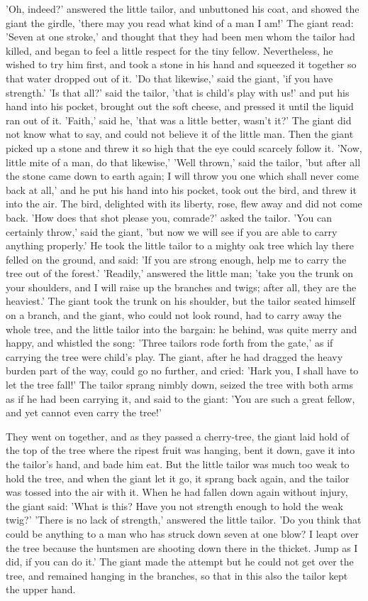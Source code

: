 \documentclass[12pt]{book}
\begin{document}
'Oh, indeed?' answered the little tailor, and unbuttoned his coat, and
showed the giant the girdle, 'there may you read what kind of a man I
am!' The giant read: 'Seven at one stroke,' and thought that they had
been men whom the tailor had killed, and began to feel a little
respect for the tiny fellow. Nevertheless, he wished to try him first,
and took a stone in his hand and squeezed it together so that water
dropped out of it. 'Do that likewise,' said the giant, 'if you have
strength.' 'Is that all?' said the tailor, 'that is child's play with
us!' and put his hand into his pocket, brought out the soft cheese,
and pressed it until the liquid ran out of it. 'Faith,' said he, 'that
was a little better, wasn't it?' The giant did not know what to say,
and could not believe it of the little man. Then the giant picked up a
stone and threw it so high that the eye could scarcely follow it.
'Now, little mite of a man, do that likewise,' 'Well thrown,' said the
tailor, 'but after all the stone came down to earth again; I will
throw you one which shall never come back at all,' and he put his hand
into his pocket, took out the bird, and threw it into the air. The
bird, delighted with its liberty, rose, flew away and did not come
back. 'How does that shot please you, comrade?' asked the tailor. 'You
can certainly throw,' said the giant, 'but now we will see if you are
able to carry anything properly.' He took the little tailor to a
mighty oak tree which lay there felled on the ground, and said: 'If
you are strong enough, help me to carry the tree out of the forest.'
'Readily,' answered the little man; 'take you the trunk on your
shoulders, and I will raise up the branches and twigs; after all, they
are the heaviest.' The giant took the trunk on his shoulder, but the
tailor seated himself on a branch, and the giant, who could not look
round, had to carry away the whole tree, and the little tailor into
the bargain: he behind, was quite merry and happy, and whistled the
song: 'Three tailors rode forth from the gate,' as if carrying the
tree were child's play. The giant, after he had dragged the heavy
burden part of the way, could go no further, and cried: 'Hark you, I
shall have to let the tree fall!' The tailor sprang nimbly down,
seized the tree with both arms as if he had been carrying it, and said
to the giant: 'You are such a great fellow, and yet cannot even carry
the tree!'

They went on together, and as they passed a cherry-tree, the giant
laid hold of the top of the tree where the ripest fruit was hanging,
bent it down, gave it into the tailor's hand, and bade him eat. But
the little tailor was much too weak to hold the tree, and when the
giant let it go, it sprang back again, and the tailor was tossed into
the air with it. When he had fallen down again without injury, the
giant said: 'What is this? Have you not strength enough to hold the
weak twig?' 'There is no lack of strength,' answered the little
tailor. 'Do you think that could be anything to a man who has struck
down seven at one blow? I leapt over the tree because the huntsmen are
shooting down there in the thicket. Jump as I did, if you can do it.'
The giant made the attempt but he could not get over the tree, and
remained hanging in the branches, so that in this also the tailor kept
the upper hand.
\end{document}
